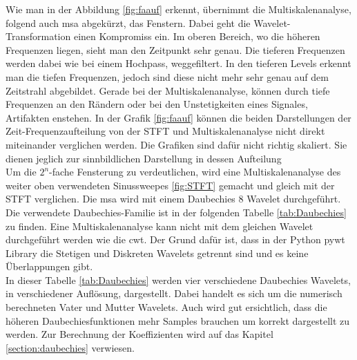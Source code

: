 Wie man in der Abbildung \ref{fig:faauf} erkennt, übernimmt die Multiskalenanalyse, folgend auch msa abgekürzt, das Fenstern. Dabei geht die Wavelet-Transformation einen Kompromiss ein. Im oberen Bereich, wo die höheren Frequenzen liegen, sieht man den Zeitpunkt sehr genau. Die tieferen Frequenzen werden dabei wie bei einem Hochpass, weggefiltert. In den tieferen Levels erkennt man die tiefen Frequenzen, jedoch sind diese nicht mehr sehr genau auf dem Zeitstrahl abgebildet. Gerade bei der Multiskalenanalyse, können durch tiefe Frequenzen an den Rändern oder bei den Unstetigkeiten eines Signales, Artifakten enstehen. In der Grafik \ref{fig:faauf} können die beiden Darstellungen der Zeit-Frequenzaufteilung von der STFT und Multiskalenanalyse nicht direkt miteinander verglichen werden. Die Grafiken sind dafür nicht richtig skaliert. Sie dienen jeglich zur sinnbildlichen Darstellung in dessen Aufteilung\\

Um die $2^{n}$-fache Fensterung zu verdeutlichen, wird eine  Multiskalenanalyse des weiter oben verwendeten Sinussweepes \ref{fig:STFT} gemacht und gleich mit der STFT verglichen.
Die msa wird mit einem Daubechies 8 Wavelet durchgeführt. Die verwendete Daubechies-Familie ist in der folgenden Tabelle \ref{tab:Daubechies} zu finden. Eine Multiskalenanalyse kann nicht mit dem gleichen Wavelet durchgeführt werden wie die cwt. Der Grund dafür ist, dass in der Python pywt Library die Stetigen und Diskreten Wavelets getrennt sind und es keine Überlappungen gibt. \\
In dieser Tabelle \ref{tab:Daubechies} werden vier verschiedene Daubechies Wavelets, in verschiedener Auflösung, dargestellt. Dabei handelt es sich um die numerisch berechneten Vater und Mutter Wavelets. Auch wird gut ersichtlich, dass die höheren Daubechiesfunktionen mehr Samples brauchen um korrekt dargestellt zu werden. Zur Berechnung der Koeffizienten wird auf das Kapitel \ref{section:daubechies} verwiesen.\\


